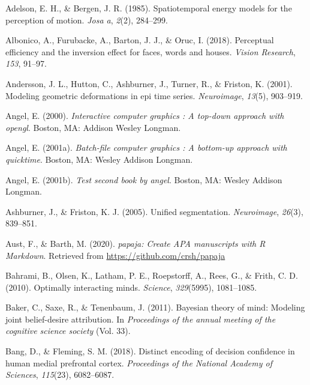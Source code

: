 \documentclass[12pt,twoside]{reedthesis}
\begin{document}
\leavevmode\hypertarget{ref-adelson1985spatiotemporal}{}%
Adelson, E. H., \& Bergen, J. R. (1985). Spatiotemporal energy models for the perception of motion. \emph{Josa a}, \emph{2}(2), 284--299.

\leavevmode\hypertarget{ref-albonico2018perceptual}{}%
Albonico, A., Furubacke, A., Barton, J. J., \& Oruc, I. (2018). Perceptual efficiency and the inversion effect for faces, words and houses. \emph{Vision Research}, \emph{153}, 91--97.

\leavevmode\hypertarget{ref-andersson2001modeling}{}%
Andersson, J. L., Hutton, C., Ashburner, J., Turner, R., \& Friston, K. (2001). Modeling geometric deformations in epi time series. \emph{Neuroimage}, \emph{13}(5), 903--919.

\leavevmode\hypertarget{ref-angel2000}{}%
Angel, E. (2000). \emph{Interactive computer graphics : A top-down approach with opengl}. Boston, MA: Addison Wesley Longman.

\leavevmode\hypertarget{ref-angel2001}{}%
Angel, E. (2001a). \emph{Batch-file computer graphics : A bottom-up approach with quicktime}. Boston, MA: Wesley Addison Longman.

\leavevmode\hypertarget{ref-angel2002a}{}%
Angel, E. (2001b). \emph{Test second book by angel}. Boston, MA: Wesley Addison Longman.

\leavevmode\hypertarget{ref-ashburner2005unified}{}%
Ashburner, J., \& Friston, K. J. (2005). Unified segmentation. \emph{Neuroimage}, \emph{26}(3), 839--851.

\leavevmode\hypertarget{ref-R-papaja}{}%
Aust, F., \& Barth, M. (2020). \emph{papaja: Create APA manuscripts with R Markdown}. Retrieved from \url{https://github.com/crsh/papaja}

\leavevmode\hypertarget{ref-bahrami2010optimally}{}%
Bahrami, B., Olsen, K., Latham, P. E., Roepstorff, A., Rees, G., \& Frith, C. D. (2010). Optimally interacting minds. \emph{Science}, \emph{329}(5995), 1081--1085.

\leavevmode\hypertarget{ref-baker2011bayesian}{}%
Baker, C., Saxe, R., \& Tenenbaum, J. (2011). Bayesian theory of mind: Modeling joint belief-desire attribution. In \emph{Proceedings of the annual meeting of the cognitive science society} (Vol. 33).

\leavevmode\hypertarget{ref-bang2018distinct}{}%
Bang, D., \& Fleming, S. M. (2018). Distinct encoding of decision confidence in human medial prefrontal cortex. \emph{Proceedings of the National Academy of Sciences}, \emph{115}(23), 6082--6087.
\end{document}
